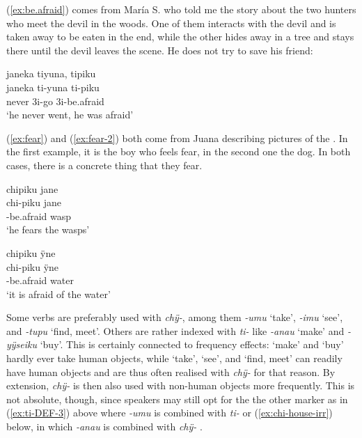 (\ref{ex:be.afraid}) comes from María S. who told me the story about the two hunters who meet the devil in the woods. One of them interacts with the devil and is taken away to be eaten in the end, while the other hides away in a tree and stays there until the devil leaves the scene. He does not try to save his friend:

\ea\label{ex:be.afraid}
\begingl 
\glpreamble janeka tiyuna, tipiku\\
\gla janeka ti-yuna ti-piku\\ 
\glb never 3i-go 3i-be.afraid\\ 
\glft ‘he never went, he was afraid’
\trailingcitation{[rxx-n120511l-2.61]}
\xe

(\ref{ex:fear}) and (\ref{ex:fear-2}) both come from Juana describing pictures of the . In the first example, it is the boy who feels fear, in the second one the dog. In both cases, there is a concrete thing that they fear.

\ea\label{ex:fear}
\begingl 
\glpreamble chipiku jane\\
\gla chi-piku jane\\ 
-be.afraid wasp\\ 
\glft ‘he fears the wasps’
\trailingcitation{[jxx-a120516l-a.125]}
\xe

\ea\label{ex:fear-2}
\begingl
\glpreamble chipiku ÿne\\
\gla chi-piku ÿne\\
-be.afraid water\\
\glft ‘it is afraid of the water’
\endgl
\trailingcitation{[jxx-a120516l-a.376]}
\xe

Some  verbs are preferably used with \textit{chÿ-}, among them \textit{-umu} ‘take’, \textit{-imu} ‘see’, and \textit{-tupu} ‘find, meet’. Others are rather indexed with \textit{ti-} like \textit{-anau} ‘make’ and \textit{-yÿseiku} ‘buy’. This is certainly connected to frequency effects: ‘make’ and ‘buy’ hardly ever take human objects, while ‘take’, ‘see’, and ‘find, meet’ can readily have human objects and are thus often realised with \textit{chÿ-} for that reason. By extension, \textit{chÿ-} is then also used with non-human objects more frequently. This is not absolute, though, since speakers may still opt for the the other marker as in  (\ref{ex:ti-DEF-3}) above where \textit{-umu} is combined with \textit{ti-} or  (\ref{ex:chi-house-irr}) below, in which \textit{-anau} is combined with \textit{chÿ-} .

